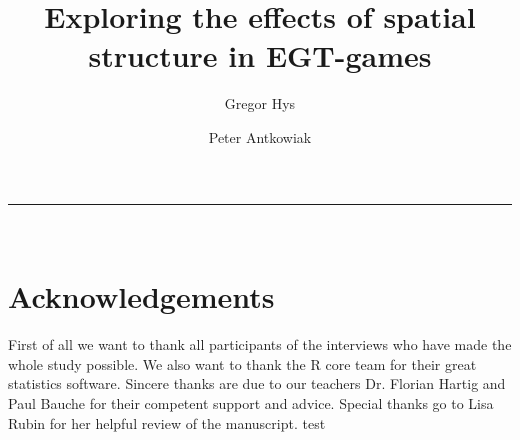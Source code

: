 \documentclass{article}
\title{Exploring the effects of spatial structure in EGT-games}
\author{Gregor Hys \and Peter Antkowiak}
\newcommand{\HRule}{\rule{\linewidth}{0.5mm}}
\begin{document}
\maketitle


\vfill



\HRule \\[0.5cm]




\newpage

\twocolumn
\sloppy












\section*{Acknowledgements}
First of all we want to thank all participants of the interviews who have made the whole study possible. We also want to thank the R core team for their great statistics software. Sincere thanks are due to our teachers Dr. Florian Hartig and Paul Bauche for their competent support and advice. Special thanks go to Lisa Rubin for her helpful review of the manuscript.
\citep{HauertandDoebeli2004} test


\onecolumn

\newpage
\newpage



\end{document}
